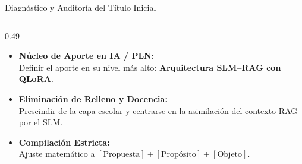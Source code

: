 \documentclass[aspectratio=169, 10pt, spanish]{beamer}
\begin{document}
\begin{frame}{Diagnóstico y Auditoría del Título Inicial}
\begin{columns}[T]
        \begin{column}{0.49\textwidth}
            \begin{tcolorbox}[enhanced, colback=white, colframe=bpGreen!80!black, title=\textbf{Corrección Arquitectónica}, arc=1.5mm, left=2mm, right=2mm, top=1.5mm, bottom=1.5mm]
                \tiny
                \begin{itemize}
                    \item[\color{bpGreen}\bfseries $\checkmark$] \textbf{Núcleo de Aporte en IA / PLN:}\\
                    Definir el aporte en su nivel más alto: \textbf{Arquitectura SLM--RAG con QLoRA}.
                    \item[\color{bpGreen}\bfseries $\checkmark$] \textbf{Eliminación de Relleno y Docencia:}\\
                    Prescindir de la capa escolar y centrarse en la asimilación del contexto RAG por el SLM.
                    \item[\color{bpGreen}\bfseries $\checkmark$] \textbf{Compilación Estricta:}\\
                    Ajuste matemático a $[\text{Propuesta}] + [\text{Propósito}] + [\text{Objeto}]$.
                \end{itemize}
            \end{tcolorbox}
        \end{column}
    \end{columns}
\end{frame}
\end{document}
